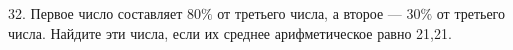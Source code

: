 32. Первое число составляет $80\%$ от третьего числа, а второе --- $30\%$ от третьего числа. Найдите эти числа, если их среднее арифметическое равно 21,21.\\
